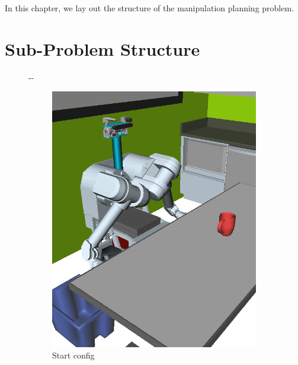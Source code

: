 \documentclass{report}
\newlength{\offsetpage}
\newenvironment{widepage}
   {\begin{adjustwidth}{-\offsetpage}{-\offsetpage}%
    \addtolength{\textwidth}{2\offsetpage}}%
{\end{adjustwidth}}
\begin{document}
In this chapter,
we lay out the structure of the manipulation planning problem.

\section{Sub-Problem Structure}

{
\setlength{\offsetpage}{0.5in}
\begin{figure}
\begin{widepage}
\begin{center}

\begin{subfigure}[t]{0.19\linewidth}
\centering
\includegraphics[width=\columnwidth]{figs/testherb-a.png}
\caption{Start config}
\end{subfigure}
\begin{subfigure}[t]{0.19\linewidth}
\centering

\end{subfigure}
\end{center}
\end{widepage}
\end{figure}}
\end{document}
